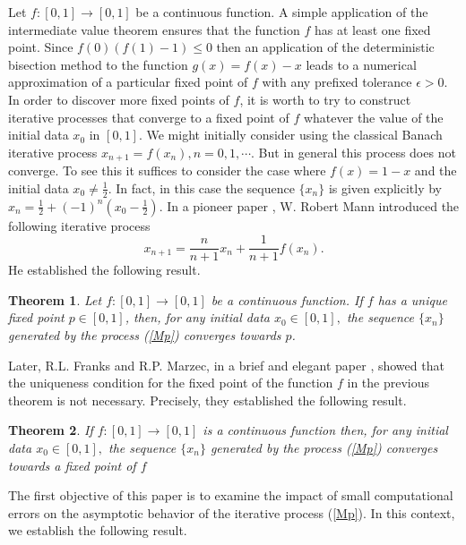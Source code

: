 \documentclass[11pt]{amsart}%
\theoremstyle{plain}
\numberwithin{equation}{section}
\newtheorem{theorem}{Theorem}[section]
\begin{document}
Let $f:[0,1]\to [0,1]$ be a continuous function. A simple application of the intermediate value theorem ensures that the function $f$ has at least one fixed point. Since $f(0)(f(1)-1)\leq0$ then an application of the deterministic bisection method to the function $g(x)=f(x)-x$ leads to a numerical approximation of a particular fixed point of $f$ with any prefixed tolerance $\epsilon>0$. In order to discover more fixed points of $f$, it is worth to try to construct iterative processes that converge to a fixed point of $f$ whatever the value of the initial data $x_0$ in $[0,1]$. We might initially consider using the classical Banach iterative process $x_{n+1}=f(x_n),n=0,1,\cdots$. But in general this process does not converge. To see this it suffices to consider the case where  $f(x)=1-x$ and the initial data $x_0\neq\frac{1}{2}$. In fact, in this case the sequence $\{x_n\}$ is given explicitly by $x_n=\frac{1}{2}+(-1)^n(x_0-\frac{1}{2})$. In a pioneer paper \cite{Man}, W. Robert Mann introduced the following iterative process
\begin{equation}
\label{Mp}
  x_{n+1}=\frac{n}{n+1}x_n+\frac{1}{n+1}f(x_n).
\end{equation}
He established the following result.
\begin{theorem}
\label{Th01}
Let $f:[0,1]\to [0,1]$ be a continuous function. If $f$  has a
unique fixed point $p\in [0,1]$, then, for any initial data $%
x_{0}\in [0,1],$ the sequence $\{x_{n}\}$ generated by the process (\ref{Mp})
converges towards $p$.
\end{theorem}
Later, R.L. Franks and R.P. Marzec, in a brief and elegant paper \cite{FM}, showed that the uniqueness condition for the fixed point of the function
$f$ in the previous theorem is not necessary. Precisely, they established the following result.
\begin{theorem}
\label{Th02}
If $f:[0,1]\to [0,1]$ is a continuous function then, for any initial data $%
x_{0}\in [0,1],$ the sequence $\{x_{n}\}$ generated by the process (\ref{Mp})
converges towards a fixed point of $f$
\end{theorem}
The first objective of this paper is to examine the impact of small computational errors on the asymptotic behavior of the iterative process (\ref{Mp}). In this context, we establish the following result.
\end{document}
